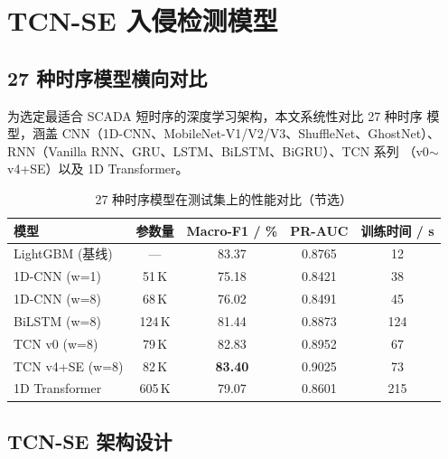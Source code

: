 
\chapter{TCN-SE 入侵检测模型}
\label{chap:tcn}


\section{27 种时序模型横向对比}
\label{sec:tcn_survey}

\par 为选定最适合 SCADA 短时序的深度学习架构，本文系统性对比 27 种时序
模型，涵盖 CNN（1D-CNN、MobileNet-V1/V2/V3、ShuffleNet、GhostNet）、
RNN（Vanilla RNN、GRU、LSTM、BiLSTM、BiGRU）、TCN 系列
（v0$\sim$v4+SE）以及 1D Transformer。

\begin{table}[H]
\centering
\caption{27 种时序模型在测试集上的性能对比（节选）}
\label{tab:model_compare}
\small
\begin{tabular}{lcccc}
\toprule
模型 & 参数量 & Macro-F1 / \% & PR-AUC & 训练时间 / s \\
\midrule
LightGBM (基线) & --- & 83.37 & 0.8765 & 12 \\
1D-CNN (w=1) & 51\,K & 75.18 & 0.8421 & 38 \\
1D-CNN (w=8) & 68\,K & 76.02 & 0.8491 & 45 \\
BiLSTM (w=8) & 124\,K & 81.44 & 0.8873 & 124 \\
TCN v0 (w=8) & 79\,K & 82.83 & 0.8952 & 67 \\
TCN v4+SE (w=8) & 82\,K & \textbf{83.40} & 0.9025 & 73 \\
1D Transformer & 605\,K & 79.07 & 0.8601 & 215 \\
\bottomrule
\end{tabular}
\end{table}


\section{TCN-SE 架构设计}
\label{sec:tcn_se_arch}

